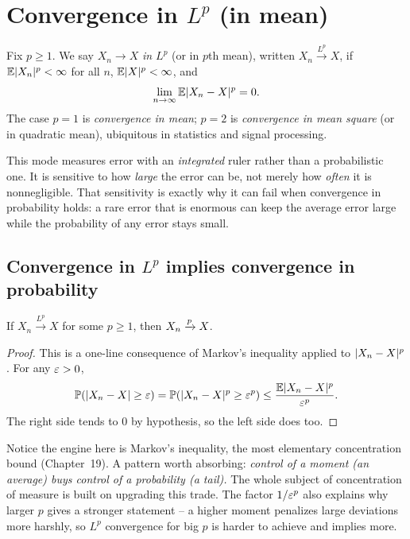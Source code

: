 \section{Convergence in \texorpdfstring{$L^p$}{Lp} (in mean)}
\label{ch22:lp}

\begin{definition}[Convergence in $L^p$]
\label{ch22:def-lp}
Fix $p\ge1$. We say $X_n \to X$ \emph{in $L^p$} (or in $p$th mean), written
$X_n \xrightarrow{L^p} X$, if $\operatorname{\mathbb{E}}\lvert X_n\rvert^p<\infty$ for all $n$, $\operatorname{\mathbb{E}}\lvert X\rvert^p < \infty$, and
\[
  \lim_{n\to\infty}\operatorname{\mathbb{E}}\lvert X_n - X\rvert^p = 0.
\]
The case $p=1$ is \emph{convergence in mean}; $p=2$ is \emph{convergence in mean
square} (or in quadratic mean), ubiquitous in statistics and signal processing.
\end{definition}

This mode measures error with an \emph{integrated} ruler rather than a probabilistic
one. It is sensitive to how \emph{large} the error can be, not merely how \emph{often}
it is nonnegligible. That sensitivity is exactly why it can fail when convergence in
probability holds: a rare error that is enormous can keep the average error large while
the probability of any error stays small.

\subsection{Convergence in $L^p$ implies convergence in probability}
\label{ch22:lp-implies-p}

\begin{theorem}
\label{ch22:thm-lp-p}
If $X_n \xrightarrow{L^p} X$ for some $p\ge1$, then $X_n \xrightarrow{p} X$.
\end{theorem}

\begin{proof}
This is a one-line consequence of Markov's inequality applied to $\lvert X_n - X\rvert^p$.
For any $\varepsilon>0$,
\[
  \operatorname{\mathbb{P}}(\lvert X_n - X\rvert\ge\varepsilon)
  = \operatorname{\mathbb{P}}(\lvert X_n - X\rvert^p \ge \varepsilon^p)
  \le \frac{\operatorname{\mathbb{E}}\lvert X_n - X\rvert^p}{\varepsilon^p}.
\]
The right side tends to $0$ by hypothesis, so the left side does too.
\end{proof}

\begin{connectionbox}
Notice the engine here is Markov's inequality, the most elementary concentration bound
(Chapter~19). A pattern worth absorbing: \emph{control of a moment
(an average) buys control of a probability (a tail).} The whole subject of
concentration of measure is built on upgrading this trade. The factor $1/\varepsilon^p$ also
explains why larger $p$ gives a stronger statement -- a higher moment penalizes large
deviations more harshly, so $L^p$ convergence for big $p$ is harder to achieve and
implies more.
\end{connectionbox}

